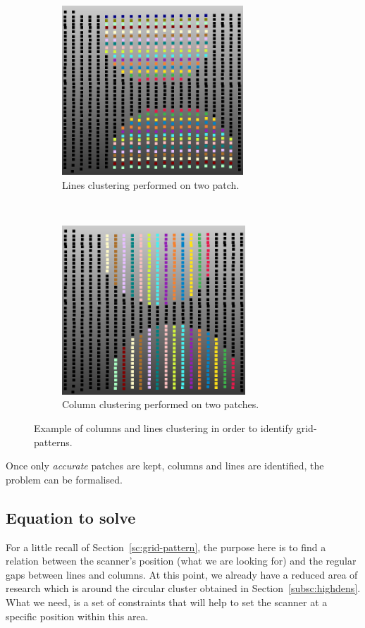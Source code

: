 \begin{figure}[t!]
  \centering
    \begin{subfigure}[t]{0.5\textwidth}
      \centering
        \includegraphics[height=2.5in]{img/grid-lines.png}
        \caption{Lines clustering performed on two patch.}
    \end{subfigure}%
    ~
    \begin{subfigure}[t]{0.5\textwidth}
      \centering
        \includegraphics[height=2.5in]{img/grid-cols.png}
        \caption{Column clustering performed on two patches.}
    \end{subfigure}
    \caption{Example of columns and lines clustering in order to identify grid-patterns.}
    \label{fig:line-col-cluster}
\end{figure}

Once only \emph{accurate} patches are kept, columns and lines are identified, the problem can be formalised.

\subsection{Equation to solve}
\label{subsc:eq}

For a little recall of Section~\ref{sc:grid-pattern}, the purpose here is to find a relation between the scanner's position (what we are looking for) and the regular gaps between lines and columns. At this point, we already have a reduced area of research which is around the circular cluster obtained in Section~\ref{subsc:highdens}. What we need, is a set of constraints that will help to set the scanner at a specific position within this area.

